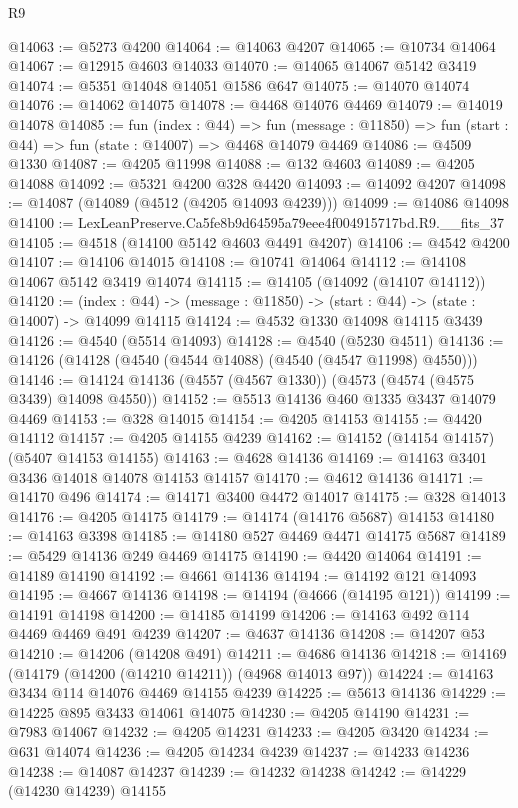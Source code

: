\begin{lexlean}{R9}
\begin{coremodule}
@14063 := @5273 @4200
@14064 := @14063 @4207
@14065 := @10734 @14064
@14067 := @12915 @4603 @14033
@14070 := @14065 @14067 @5142 @3419
@14074 := @5351 @14048 @14051 @1586 @647
@14075 := @14070 @14074
@14076 := @14062 @14075
@14078 := @4468 @14076 @4469
@14079 := @14019 @14078
@14085 := fun (index : @44) =>
  fun (message : @11850) => fun (start : @44) => fun (state : @14007) => @4468 @14079 @4469
@14086 := @4509 @1330
@14087 := @4205 @11998
@14088 := @132 @4603
@14089 := @4205 @14088
@14092 := @5321 @4200 @328 @4420
@14093 := @14092 @4207
@14098 := @14087 (@14089 (@4512 (@4205 @14093 @4239)))
@14099 := @14086 @14098
@14100 := LexLeanPreserve.Ca5fe8b9d64595a79eee4f004915717bd.R9.__fits_37
@14105 := @4518 (@14100 @5142 @4603 @4491 @4207)
@14106 := @4542 @4200
@14107 := @14106 @14015
@14108 := @10741 @14064
@14112 := @14108 @14067 @5142 @3419 @14074
@14115 := @14105 (@14092 (@14107 @14112))
@14120 := (index : @44) -> (message : @11850) -> (start : @44) -> (state : @14007) -> @14099 @14115
@14124 := @4532 @1330 @14098 @14115 @3439
@14126 := @4540 (@5514 @14093)
@14128 := @4540 (@5230 @4511)
@14136 := @14126 (@14128 (@4540 (@4544 @14088) (@4540 (@4547 @11998) @4550)))
@14146 := @14124 @14136 (@4557 (@4567 @1330)) (@4573 (@4574 (@4575 @3439) @14098 @4550))
@14152 := @5513 @14136 @460 @1335 @3437 @14079 @4469
@14153 := @328 @14015
@14154 := @4205 @14153
@14155 := @4420 @14112
@14157 := @4205 @14155 @4239
@14162 := @14152 (@14154 @14157) (@5407 @14153 @14155)
@14163 := @4628 @14136
@14169 := @14163 @3401 @3436 @14018 @14078 @14153 @14157
@14170 := @4612 @14136
@14171 := @14170 @496
@14174 := @14171 @3400 @4472 @14017
@14175 := @328 @14013
@14176 := @4205 @14175
@14179 := @14174 (@14176 @5687) @14153
@14180 := @14163 @3398
@14185 := @14180 @527 @4469 @4471 @14175 @5687
@14189 := @5429 @14136 @249 @4469 @14175
@14190 := @4420 @14064
@14191 := @14189 @14190
@14192 := @4661 @14136
@14194 := @14192 @121 @14093
@14195 := @4667 @14136
@14198 := @14194 (@4666 (@14195 @121))
@14199 := @14191 @14198
@14200 := @14185 @14199
@14206 := @14163 @492 @114 @4469 @4469 @491 @4239
@14207 := @4637 @14136
@14208 := @14207 @53
@14210 := @14206 (@14208 @491)
@14211 := @4686 @14136
@14218 := @14169 (@14179 (@14200 (@14210 @14211)) (@4968 @14013 @97))
@14224 := @14163 @3434 @114 @14076 @4469 @14155 @4239
@14225 := @5613 @14136
@14229 := @14225 @895 @3433 @14061 @14075
@14230 := @4205 @14190
@14231 := @7983 @14067
@14232 := @4205 @14231
@14233 := @4205 @3420
@14234 := @631 @14074
@14236 := @4205 @14234 @4239
@14237 := @14233 @14236
@14238 := @14087 @14237
@14239 := @14232 @14238
@14242 := @14229 (@14230 @14239) @14155

\end{coremodule}
\end{lexlean}
